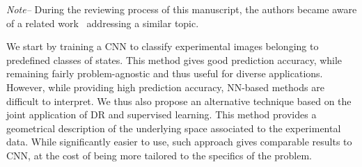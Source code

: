 \textit{Note--} During the reviewing process of this manuscript, the authors
became aware of a related work~\cite{liu2019superhighresolution} addressing a similar topic.


We start by training a \ac{CNN} to classify experimental images belonging to predefined classes of states. This method gives good prediction accuracy, while remaining fairly problem-agnostic and thus useful for diverse applications. However, while providing high prediction accuracy, NN-based methods are difficult to interpret.
We thus also propose an alternative technique based on the joint application of \ac{DR} and supervised learning.
This method provides a geometrical description of the underlying space associated to the experimental data.
While significantly easier to use, such approach gives comparable results to CNN,
at the cost of being more tailored to the specifics of the problem.

